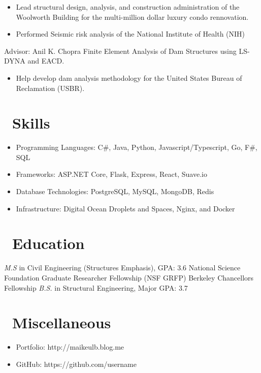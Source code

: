 \documentclass{resume}
\begin{document}
\begin{itemize}
  \item Lead structural design, analysis, and construction administration of the Woolworth Building for the
          multi-million dollar luxury condo rennovation. 
  \item Performed Seismic risk analysis of the National Institute of Health (NIH)
\end{itemize}

 {Advisor: Anil K. Chopra}
Finite Element Analysis of Dam Structures using LS-DYNA and EACD.
\begin{itemize}
  \item Help develop dam analysis methodology for the United States Bureau of
          Reclamation (USBR).
\end{itemize}


\section{\faCogs\ Skills}
\begin{itemize}[parsep=0.5ex]
  \item Programming Languages: C#, Java, Python, Javascript/Typescript, Go, F#, SQL
  \item Frameworks: ASP.NET Core, Flask, Express, React, Suave.io
  \item Database Technologies: PostgreSQL, MySQL, MongoDB, Redis
  \item Infrastructure: Digital Ocean Droplets and Spaces, Nginx, and Docker
\end{itemize}

\section{\faGraduationCap\ Education}
\textit{M.S } in Civil Engineering (Structures Emphasis), GPA: 3.6
National Science Foundation Graduate Researcher Fellowship (NSF GRFP)
Berkeley Chancellors Fellowship
\textit{B.S.} in Structural Engineering, Major GPA: 3.7

\section{\faInfo\ Miscellaneous}
\begin{itemize}[parsep=0.5ex]
  \item Portfolio: http://maikeulb.blog.me
  \item GitHub: https://github.com/username
\end{itemize}

%
%
\end{document}
